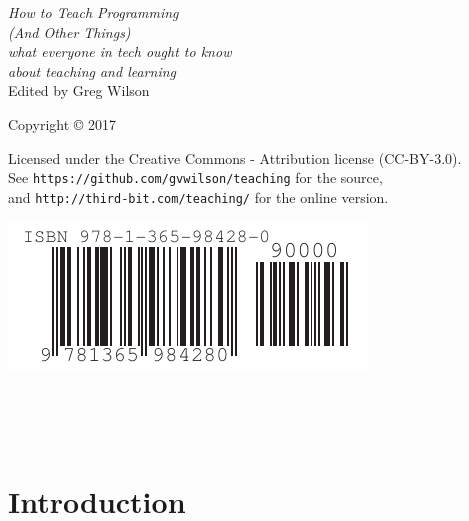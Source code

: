 \documentclass[10pt,statementpaper]{memoir}
\begin{document}
\pagestyle{empty}

{\begingroup
  \raggedleft
  \vspace*{\baselineskip}

  {\Huge\itshape How to Teach Programming \\ (And Other Things)}\\[\baselineskip]

  {\large\itshape
    what everyone in tech ought to know\\ about teaching and learning
  }\\[0.2\textheight]

  {\large Edited by Greg Wilson}\par

  \vfill

  {\large Copyright {\copyright} 2017}

  \vspace*{\baselineskip}

  {\small
    Licensed under the Creative Commons - Attribution license (CC-BY-3.0).
    \\
    See \texttt{https://github.com/gvwilson/teaching} for the source,\\
    and \texttt{http://third-bit.com/teaching/} for the online version.
  }

  \vspace*{4\baselineskip}

  \includegraphics{isbn-barcode.pdf}

\endgroup}

\newpage

\pagestyle{empty}

~

\newpage

\tableofcontents

\newpage

\pagestyle{empty}

~

\newpage

\pagestyle{plain}

\chapter{Introduction}\label{introduction}
\end{document}
